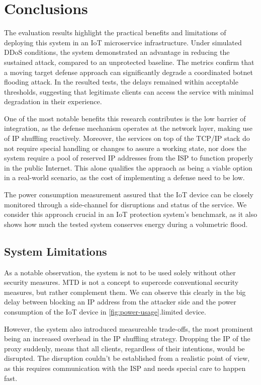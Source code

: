 \chapter{Conclusions}
\label{chap:conclusion}
The evaluation results highlight the practical benefits and limitations of deploying this system in an IoT microservice infrastructure. Under simulated DDoS conditions, the system demonstrated an advantage in reducing the sustained attack, compared to an unprotected baseline. The metrics confirm that a moving target defense approach can significantly degrade a coordinated botnet flooding attack. In the resulted tests, the delays remained within acceptable thresholds, suggesting that legitimate clients can access the service with minimal degradation in their experience.

One of the most notable benefits this research contributes is the low barrier of integration, as the defense mechanism operates at the network layer, making use of IP shuffling reactively. Moreover, the services on top of the TCP/IP stack do not require special handling or changes to assure a working state, nor does the system require a pool of reserved IP addresses from the ISP to function properly in the public Internet. This alone qualifies the appraoch as being a viable option in a real-world scenario, as the cost of implementing a defense need to be low. 

The power consumption measurement assured that the IoT device can be closely monitored through a side-channel for disruptions and status of the service. We consider this approach crucial in an IoT protection system's benchmark, as it also shows how much the tested system conserves energy during a volumetric flood. 

\section{System Limitations}
As a notable observation, the system is not to be used solely without other security measures. MTD is not a concept to supercede conventional security measures, but rather complement them. We can observe this clearly in the big delay between blocking an IP address from the attacker side and the power consumption of the IoT device in \autoref{fig:power-usage}.limited device. 

However, the system also introduced measureable trade-offs, the most prominent being an increased overhead in the IP shuffling strategy. Dropping the IP of the proxy suddenly, means that all clients, regardless of their intentions, would be disrupted. The disruption couldn't be established from a realistic point of view, as this requires communication with the ISP and needs special care to happen fast.

